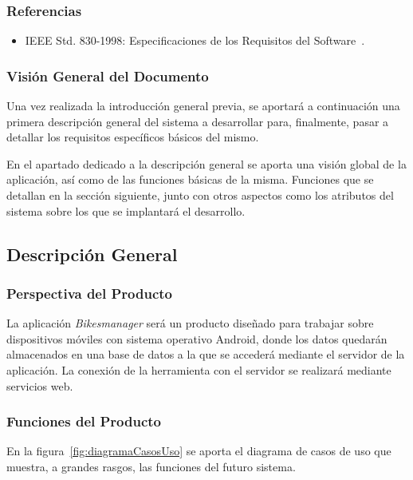 \subsubsection{Referencias}

\begin{itemize}
	\item IEEE Std. 830-1998: Especificaciones de los Requisitos del Software~\cite{IE830}.
\end{itemize}

\subsubsection{Visión General del Documento}

Una vez realizada la introducción general previa, se aportará a continuación una primera descripción general del sistema a desarrollar para, finalmente, pasar a detallar los requisitos específicos básicos del mismo.

En el apartado dedicado a la descripción general se aporta una visión global de la aplicación, así como de las funciones básicas de la misma. Funciones que se detallan en la sección siguiente, junto con otros aspectos como los atributos del sistema sobre los que se implantará el desarrollo.

\subsection{Descripción General}

\subsubsection{Perspectiva del Producto}

La aplicación \emph{Bikesmanager} será un producto diseñado para trabajar sobre dispositivos móviles con sistema operativo Android, donde los datos quedarán almacenados en una base de datos a la que se accederá mediante el servidor de la aplicación. La conexión de la herramienta con el servidor se realizará mediante servicios web.

\subsubsection{Funciones del Producto}

En la figura~\ref{fig:diagramaCasosUso} se aporta el diagrama de casos de uso que muestra, a grandes rasgos, las funciones del futuro sistema.

